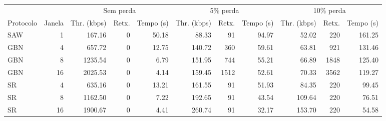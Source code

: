 \begin{tabular}{lr|rrr|rrr|rrr}
\hline
 & & \multicolumn{3}{c|}{Sem perda} & \multicolumn{3}{c|}{5\% perda} & \multicolumn{3}{c}{10\% perda} \\
Protocolo & Janela & Thr. (kbps) & Retx. & Tempo (s) & Thr. (kbps) & Retx. & Tempo (s) & Thr. (kbps) & Retx. & Tempo (s) \\
\hline
SAW & 1 & 167.16 & 0 & 50.18 & 88.33 & 91 & 94.97 & 52.02 & 220 & 161.25 \\
GBN & 4 & 657.72 & 0 & 12.75 & 140.72 & 360 & 59.61 & 63.81 & 921 & 131.46 \\
GBN & 8 & 1235.54 & 0 & 6.79 & 151.95 & 744 & 55.21 & 66.89 & 1848 & 125.40 \\
GBN & 16 & 2025.53 & 0 & 4.14 & 159.45 & 1512 & 52.61 & 70.33 & 3562 & 119.27 \\
SR & 4 & 635.16 & 0 & 13.21 & 161.55 & 91 & 51.93 & 84.35 & 220 & 99.45 \\
SR & 8 & 1162.50 & 0 & 7.22 & 192.65 & 91 & 43.54 & 109.64 & 220 & 76.51 \\
SR & 16 & 1900.67 & 0 & 4.41 & 260.74 & 91 & 32.17 & 153.70 & 220 & 54.58 \\
\hline
\end{tabular}
